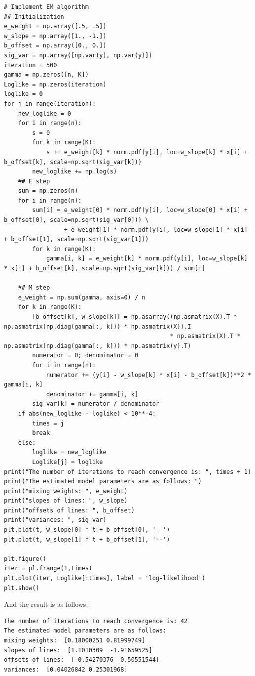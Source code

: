 \documentclass[letterpaper,11pt]{article}
\begin{document}
\begin{spacing}{1.2}
\begin{lstlisting}
# Implement EM algorithm
## Initialization
e_weight = np.array([.5, .5])
w_slope = np.array([1., -1.])
b_offset = np.array([0., 0.])
sig_var = np.array([np.var(y), np.var(y)])
iteration = 500
gamma = np.zeros([n, K])
Loglike = np.zeros(iteration)
loglike = 0
for j in range(iteration):
    new_loglike = 0
    for i in range(n):
        s = 0
        for k in range(K):
            s += e_weight[k] * norm.pdf(y[i], loc=w_slope[k] * x[i] + b_offset[k], scale=np.sqrt(sig_var[k]))
        new_loglike += np.log(s)
    ## E step
    sum = np.zeros(n)
    for i in range(n):
        sum[i] = e_weight[0] * norm.pdf(y[i], loc=w_slope[0] * x[i] + b_offset[0], scale=np.sqrt(sig_var[0])) \
                 + e_weight[1] * norm.pdf(y[i], loc=w_slope[1] * x[i] + b_offset[1], scale=np.sqrt(sig_var[1]))
        for k in range(K):
            gamma[i, k] = e_weight[k] * norm.pdf(y[i], loc=w_slope[k] * x[i] + b_offset[k], scale=np.sqrt(sig_var[k])) / sum[i]

    ## M step
    e_weight = np.sum(gamma, axis=0) / n
    for k in range(K):
        [b_offset[k], w_slope[k]] = np.asarray((np.asmatrix(X).T * np.asmatrix(np.diag(gamma[:, k])) * np.asmatrix(X)).I
                                               * np.asmatrix(X).T * np.asmatrix(np.diag(gamma[:, k])) * np.asmatrix(y).T)
        numerator = 0; denominator = 0
        for i in range(n):
            numerator += (y[i] - w_slope[k] * x[i] - b_offset[k])**2 * gamma[i, k]
            denominator += gamma[i, k]
        sig_var[k] = numerator / denominator
    if abs(new_loglike - loglike) < 10**-4:
        times = j
        break
    else:
        loglike = new_loglike
        Loglike[j] = loglike
print("The number of iterations to reach convergence is: ", times + 1)
print("The estimated model parameters are as follows: ")
print("mixing weights: ", e_weight)
print("slopes of lines: ", w_slope)
print("offsets of lines: ", b_offset)
print("variances: ", sig_var)
plt.plot(t, w_slope[0] * t + b_offset[0], '--')
plt.plot(t, w_slope[1] * t + b_offset[1], '--')

plt.figure()
iter = pl.frange(1,times)
plt.plot(iter, Loglike[:times], label = 'log-likelihood')
plt.show()
\end{lstlisting}

And the result is as follows:
\begin{lstlisting}
The number of iterations to reach convergence is: 42
The estimated model parameters are as follows: 
mixing weights:  [0.18000251 0.81999749]
slopes of lines:  [1.1010309  -1.91659525]
offsets of lines:  [-0.54270376  0.50551544]
variances:  [0.04026842 0.25301968]
\end{lstlisting}


\end{spacing}
\end{document}
